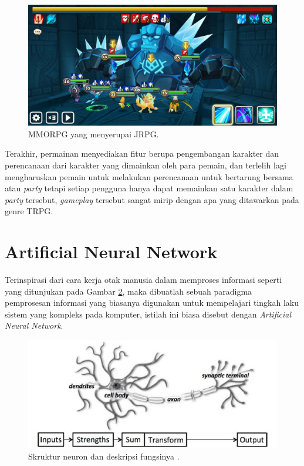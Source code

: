 \begin{subs}
	\begin{figure} [!h] \centering
		\includegraphics[scale=0.26]{img/sw.jpg}
		\caption{MMORPG yang menyerupai JRPG.}
		\label{fig:sw}
	\end{figure}
	
	Terakhir, permainan menyediakan fitur berupa pengembangan karakter dan perencanaan dari karakter yang dimainkan oleh para pemain, dan terlelih lagi mengharuskan pemain untuk melakukan perencanaan untuk bertarung bersama atau \textit{party} tetapi setiap pengguna hanya dapat memainkan satu karakter dalam \textit{party} tersebut, \textit{gameplay} tersebut sangat mirip dengan apa yang ditawarkan pada genre TRPG.
\end{subs}

\section{Artificial Neural Network}
\label{sec:sec2_ann}
\vspace{1ex}

Terinspirasi dari cara kerja otak manusia dalam memproses informasi seperti yang ditunjukan pada Gambar \ref{fig:ann_neuron}, maka dibuatlah sebuah paradigma pemprosesan informasi yang biasanya digunakan untuk mempelajari tingkah laku sistem yang kompleks pada komputer, istilah ini biasa disebut dengan \textit{Artificial Neural Network}.
\vspace{1ex}

\begin{figure} [!h] \centering
	\includegraphics[scale=0.7]{img/ann_neuron.png}
	\caption{Skruktur neuron dan deskripsi fungsinya \citep{buduma2017}.}
	\label{fig:ann_neuron}
\end{figure}

